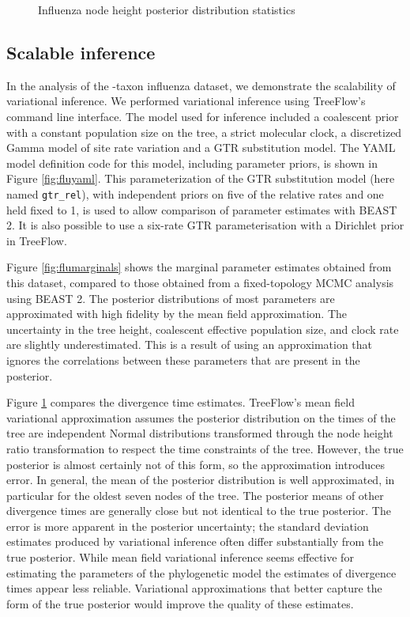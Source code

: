 \begin{figure}
    \centering
    \caption{Influenza node height posterior distribution statistics}
    \label{fig:flutree}
\end{figure}

\subsection{Scalable inference}

In the analysis of the -taxon influenza dataset, we demonstrate the scalability of variational inference. We performed variational inference using TreeFlow's command line interface. The model used for inference included a coalescent prior with a constant population size on the tree, a strict molecular clock, a discretized Gamma model of site rate variation and a GTR substitution model. The YAML model definition code for this model, including parameter priors, is shown in Figure \ref{fig:fluyaml}. This parameterization of the GTR substitution model (here named \texttt{gtr\_rel}), with independent priors on five of the relative rates and one held fixed to 1, is used to allow comparison of parameter estimates with BEAST 2. It is also possible to use a six-rate GTR parameterisation with a Dirichlet prior in TreeFlow.

Figure \ref{fig:flumarginals} shows the marginal parameter estimates obtained from this dataset, compared to those obtained from a fixed-topology MCMC analysis using BEAST 2. The posterior distributions of most parameters are approximated with high fidelity by the mean field approximation. The uncertainty in the tree height, coalescent effective population size, and clock rate are slightly underestimated. This is a result of using an approximation that ignores the correlations between these parameters that are present in the posterior.

Figure \ref{fig:flutree} compares the divergence time estimates. TreeFlow's mean field variational approximation assumes the posterior distribution on the times of the tree are independent Normal distributions transformed through the node height ratio transformation to respect the time constraints of the tree. However, the true posterior is almost certainly not of this form, so the approximation introduces error. In general, the mean of the posterior distribution is well approximated, in particular for the oldest seven nodes of the tree. The posterior means of other divergence times are generally close but not identical to the true posterior. The error is more apparent in the posterior uncertainty; the standard deviation estimates produced by variational inference often differ substantially from the true posterior. While mean field variational inference seems effective for estimating the parameters of the phylogenetic model the estimates of divergence times appear less reliable. Variational approximations that better capture the form of the true posterior would improve the quality of these estimates.

